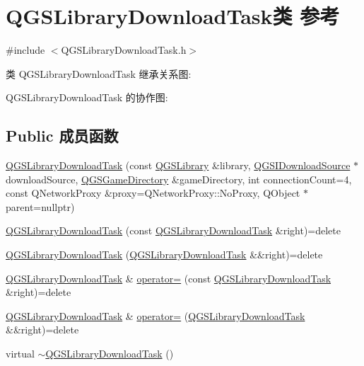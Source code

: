 \hypertarget{class_q_g_s_library_download_task}{}\section{Q\+G\+S\+Library\+Download\+Task类 参考}
\label{class_q_g_s_library_download_task}


{\ttfamily \#include $<$Q\+G\+S\+Library\+Download\+Task.\+h$>$}



类 Q\+G\+S\+Library\+Download\+Task 继承关系图\+:


Q\+G\+S\+Library\+Download\+Task 的协作图\+:
\subsection*{Public 成员函数}
\begin{DoxyCompactItemize}
\item 
\mbox{\hyperlink{class_q_g_s_library_download_task_aca2cd8f14c145c394414e06ea316d07f}{Q\+G\+S\+Library\+Download\+Task}} (const \mbox{\hyperlink{class_q_g_s_library}{Q\+G\+S\+Library}} \&library, \mbox{\hyperlink{class_q_g_s_i_download_source}{Q\+G\+S\+I\+Download\+Source}} $\ast$download\+Source, \mbox{\hyperlink{class_q_g_s_game_directory}{Q\+G\+S\+Game\+Directory}} \&game\+Directory, int connection\+Count=4, const Q\+Network\+Proxy \&proxy=Q\+Network\+Proxy\+::\+No\+Proxy, Q\+Object $\ast$parent=nullptr)
\item 
\mbox{\hyperlink{class_q_g_s_library_download_task_ace7e28285af10309db680d255864936a}{Q\+G\+S\+Library\+Download\+Task}} (const \mbox{\hyperlink{class_q_g_s_library_download_task}{Q\+G\+S\+Library\+Download\+Task}} \&right)=delete
\item 
\mbox{\hyperlink{class_q_g_s_library_download_task_a996294e4d95eae6eaeb27aaaca6d7a60}{Q\+G\+S\+Library\+Download\+Task}} (\mbox{\hyperlink{class_q_g_s_library_download_task}{Q\+G\+S\+Library\+Download\+Task}} \&\&right)=delete
\item 
\mbox{\hyperlink{class_q_g_s_library_download_task}{Q\+G\+S\+Library\+Download\+Task}} \& \mbox{\hyperlink{class_q_g_s_library_download_task_a6052a83db1f2d880278aafaa9c530604}{operator=}} (const \mbox{\hyperlink{class_q_g_s_library_download_task}{Q\+G\+S\+Library\+Download\+Task}} \&right)=delete
\item 
\mbox{\hyperlink{class_q_g_s_library_download_task}{Q\+G\+S\+Library\+Download\+Task}} \& \mbox{\hyperlink{class_q_g_s_library_download_task_abdeee65f99fa19446bceab84d550a765}{operator=}} (\mbox{\hyperlink{class_q_g_s_library_download_task}{Q\+G\+S\+Library\+Download\+Task}} \&\&right)=delete
\item 
virtual \mbox{\hyperlink{class_q_g_s_library_download_task_afa4b66ca00e1e32db886a5496e5cd126}{$\sim$\+Q\+G\+S\+Library\+Download\+Task}} ()
\end{DoxyCompactItemize}
